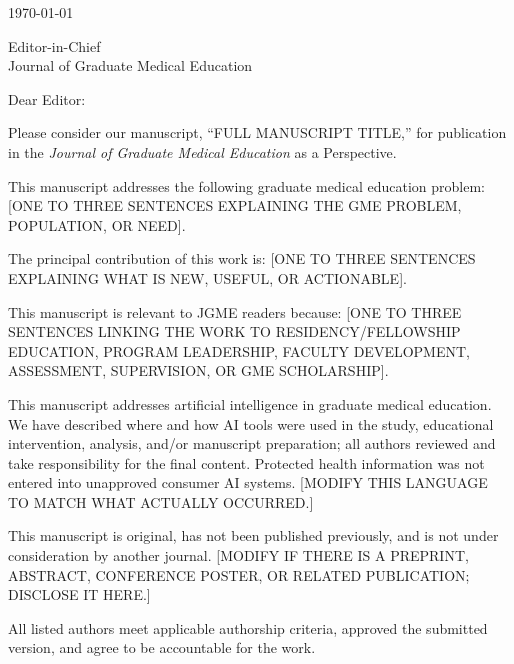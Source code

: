 \documentclass[12pt]{article}
\newcommand{\ManuscriptTitle}{FULL MANUSCRIPT TITLE}
\newcommand{\ManuscriptCategory}{Perspective} %
\begin{document}

\begin{flushleft}
	\today

	Editor-in-Chief\\
	Journal of Graduate Medical Education
\end{flushleft}

\vspace{1em}

Dear Editor:

Please consider our manuscript, ``\ManuscriptTitle,'' for publication in the
\textit{Journal of Graduate Medical Education} as a \ManuscriptCategory.


This manuscript addresses the following graduate medical education problem:
[ONE TO THREE SENTENCES EXPLAINING THE GME PROBLEM, POPULATION, OR NEED].

The principal contribution of this work is:
[ONE TO THREE SENTENCES EXPLAINING WHAT IS NEW, USEFUL, OR ACTIONABLE].

This manuscript is relevant to JGME readers because:
[ONE TO THREE SENTENCES LINKING THE WORK TO RESIDENCY/FELLOWSHIP EDUCATION,
PROGRAM LEADERSHIP, FACULTY DEVELOPMENT, ASSESSMENT, SUPERVISION, OR GME
SCHOLARSHIP].

This manuscript addresses artificial intelligence in graduate medical
education. We have described where and how AI tools were used in the study,
educational intervention, analysis, and/or manuscript preparation; all
authors reviewed and take responsibility for the final content. Protected
health information was not entered into unapproved consumer AI systems.
	[MODIFY THIS LANGUAGE TO MATCH WHAT ACTUALLY OCCURRED.]

This manuscript is original, has not been published previously, and is not
under consideration by another journal. [MODIFY IF THERE IS A PREPRINT,
		ABSTRACT, CONFERENCE POSTER, OR RELATED PUBLICATION; DISCLOSE IT HERE.]

All listed authors meet applicable authorship criteria, approved the submitted
version, and agree to be accountable for the work.
\end{document}
